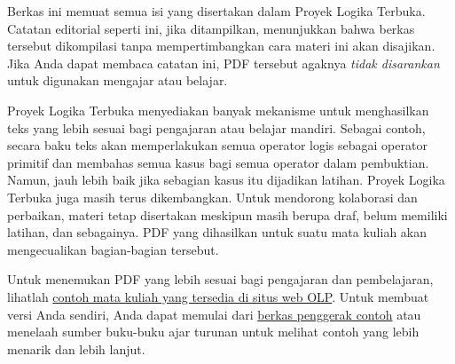 \documentclass[../include/open-logic-part]{subfiles}
\begin{document}
\clearpage

\begin{editorial}
Berkas ini memuat semua isi yang disertakan dalam Proyek Logika Terbuka.
Catatan editorial seperti ini, jika ditampilkan, menunjukkan bahwa berkas
tersebut dikompilasi tanpa mempertimbangkan cara materi ini akan disajikan.
Jika Anda dapat membaca catatan ini, PDF tersebut agaknya \emph{tidak
disarankan} untuk digunakan mengajar atau belajar.

Proyek Logika Terbuka menyediakan banyak mekanisme untuk menghasilkan teks
yang lebih sesuai bagi pengajaran atau belajar mandiri. Sebagai contoh, secara
baku teks akan memperlakukan semua operator logis sebagai operator primitif
dan membahas semua kasus bagi semua operator dalam pembuktian. Namun, jauh
lebih baik jika sebagian kasus itu dijadikan latihan. Proyek Logika Terbuka
juga masih terus dikembangkan. Untuk mendorong kolaborasi dan perbaikan,
materi tetap disertakan meskipun masih berupa draf, belum memiliki latihan,
dan sebagainya. PDF yang dihasilkan untuk suatu mata kuliah akan mengecualikan
bagian-bagian tersebut.

Untuk menemukan PDF yang lebih sesuai bagi pengajaran dan pembelajaran,
lihatlah \href{http://builds.openlogicproject.org/}{contoh mata kuliah yang
  tersedia di situs web OLP}. Untuk membuat versi Anda sendiri, Anda dapat
memulai dari
\href{https://github.com/OpenLogicProject/OpenLogic/tree/master/courses/sample}{berkas
  penggerak contoh} atau menelaah sumber buku-buku ajar turunan untuk melihat
contoh yang lebih menarik dan lebih lanjut.
\end{editorial}


















\end{document}
